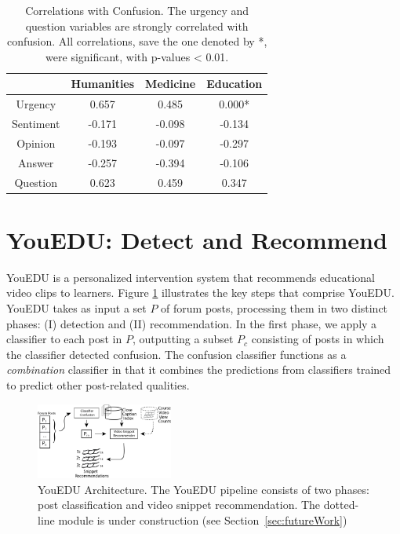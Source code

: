 \documentclass{edm_template}
\begin{document}
\begin{table}
       \centering
       \begin{tabular}{|c|c|c|c|}
       \hline
          & Humanities & Medicine & Education \\ \hline
        Urgency   & 0.657                & 0.485              & 0.000* \\ \hline
        Sentiment & -0.171                & -0.098             & -0.134 \\ \hline
        Opinion   & -0.193                & -0.097             & -0.297 \\ \hline
        Answer    & -0.257                & -0.394             & -0.106  \\ \hline
        Question  & 0.623                & 0.459              & 0.347  \\ \hline
       \end{tabular}
       \caption{\textnormal{
       Correlations with Confusion. The urgency and question variables are strongly correlated with confusion. All correlations, save the one denoted by *, were significant, with p-values < 0.01.
       }} 
       \label{table:correlations} %
\end{table}

\section{YouEDU: Detect and Recommend}
\label{sec:arch}

YouEDU is a personalized intervention system that recommends educational video clips to learners. Figure \ref{figure:architecture} illustrates the key steps that comprise YouEDU. YouEDU takes as input a set $P$ of forum posts, processing them in two distinct phases: (I) detection and (II) recommendation. In the first phase, we apply a classifier to each post in $P$, outputting a subset $P_{c}$ consisting of posts in which the classifier detected confusion. The confusion classifier functions as a \emph{combination} classifier in that it combines the predictions from classifiers trained to predict other post-related qualities.

\begin{figure}[ht]
       \centering
       \includegraphics[width=0.4\textwidth]{../Figs/youEduArch.png}
       \caption{\textnormal{YouEDU Architecture. The YouEDU pipeline
           consists of two phases: post classification and video
           snippet recommendation. The dotted-line module is under
           construction (see Section~\ref{sec:futureWork})}}
       \label{figure:architecture}
\end{figure}
\end{document}

